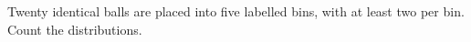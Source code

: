 Twenty identical balls are placed into five labelled bins, with at least two per bin. Count the distributions.
